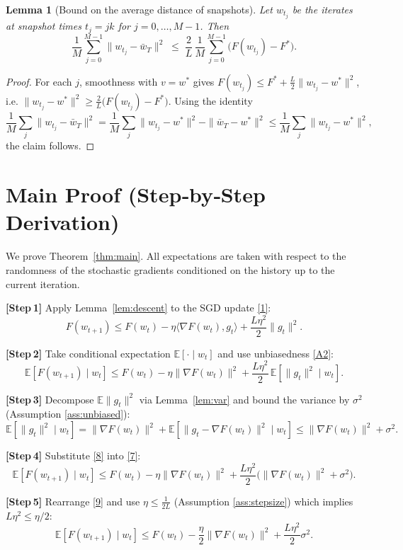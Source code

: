 \documentclass{article}
\newtheorem{lemma}{Lemma}
\begin{document}
\begin{lemma}[Bound on the average distance of snapshots]\label{lem:dist}
Let $w_{t_j}$ be the iterates at snapshot times $t_j=jk$ for $j=0,\dots,M-1$.  
Then
\[
\frac{1}{M}\sum_{j=0}^{M-1}\|w_{t_j}-\bar w_T\|^{2}
\;\le\;
\frac{2}{L}\,\frac{1}{M}\sum_{j=0}^{M-1}\!\big(F(w_{t_j})-F^{*}\big).
\tag{L4}
\]
\end{lemma}
\begin{proof}
For each $j$, smoothness with $v=w^{*}$ gives
$F(w_{t_j})\le F^{*}+\frac{L}{2}\|w_{t_j}-w^{*}\|^{2}$, i.e.
$\|w_{t_j}-w^{*}\|^{2}\ge \frac{2}{L}\big(F(w_{t_j})-F^{*}\big)$.  
Using the identity
\[
\frac{1}{M}\sum_{j}\|w_{t_j}-\bar w_T\|^{2}
= \frac{1}{M}\sum_{j}\|w_{t_j}-w^{*}\|^{2}
   -\|\bar w_T-w^{*}\|^{2}
\le \frac{1}{M}\sum_{j}\|w_{t_j}-w^{*}\|^{2},
\]
the claim follows.
\end{proof}

\section*{Main Proof (Step‑by‑Step Derivation)}
We prove Theorem~\ref{thm:main}.  
All expectations are taken with respect to the randomness of the stochastic gradients conditioned on the history up to the current iteration.

\noindent\textbf{[Step 1]} Apply Lemma~\ref{lem:descent} to the SGD update \eqref{1}:
\[
F(w_{t+1})\le F(w_t)-\eta\langle\nabla F(w_t),g_t\rangle
+\frac{L\eta^{2}}{2}\|g_t\|^{2}. \tag{6}
\]

\noindent\textbf{[Step 2]} Take conditional expectation $\mathbb{E}[\cdot\mid w_t]$ and use unbiasedness \eqref{A2}:
\[
\mathbb{E}\!\left[F(w_{t+1})\mid w_t\right]
\le F(w_t)-\eta\|\nabla F(w_t)\|^{2}
+\frac{L\eta^{2}}{2}\,\mathbb{E}\!\left[\|g_t\|^{2}\mid w_t\right].
\tag{7}
\]

\noindent\textbf{[Step 3]} Decompose $\mathbb{E}\|g_t\|^{2}$ via Lemma~\ref{lem:var} and bound the variance by $\sigma^{2}$ (Assumption \ref{ass:unbiased}):
\[
\mathbb{E}\!\left[\|g_t\|^{2}\mid w_t\right]
= \|\nabla F(w_t)\|^{2}+ \mathbb{E}\!\left[\|g_t-\nabla F(w_t)\|^{2}\mid w_t\right]
\le \|\nabla F(w_t)\|^{2}+ \sigma^{2}.
\tag{8}
\]

\noindent\textbf{[Step 4]} Substitute \eqref{8} into \eqref{7}:
\[
\mathbb{E}\!\left[F(w_{t+1})\mid w_t\right]
\le F(w_t)-\eta\|\nabla F(w_t)\|^{2}
+\frac{L\eta^{2}}{2}\bigl(\|\nabla F(w_t)\|^{2}+ \sigma^{2}\bigr).
\tag{9}
\]

\noindent\textbf{[Step 5]} Rearrange \eqref{9} and use $\eta\le\frac{1}{2L}$ (Assumption \ref{ass:stepsize}) which implies $L\eta^{2}\le\eta/2$:
\[
\mathbb{E}\!\left[F(w_{t+1})\mid w_t\right]
\le F(w_t)-\frac{\eta}{2}\|\nabla F(w_t)\|^{2}
+\frac{L\eta^{2}}{2}\sigma^{2}.
\tag{10}
\]
\end{document}

